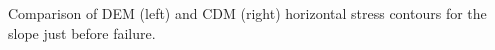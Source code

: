 \label{fig:S11DNS} Comparison of DEM (left) and CDM (right) horizontal stress contours for the slope just before failure.  